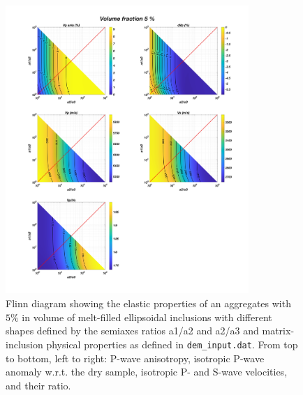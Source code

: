 \begin{figure}[ht]
    \centering
    \includegraphics[width=0.82\textwidth]{EXEV/dem_elastic0.05.jpg}
    \caption{Flinn diagram showing the elastic properties of an aggregates with $5\%$ in volume of melt-filled ellipsoidal inclusions with different shapes defined by the semiaxes ratios a1/a2 and a2/a3 and matrix-inclusion physical properties as defined in \texttt{dem\_input.dat}. From top to bottom, left to right: P-wave anisotropy, isotropic P-wave anomaly w.r.t. the dry sample, isotropic P- and S-wave velocities, and their ratio.}
    \label{fig:dem_elastic}
\end{figure}

\newpage

